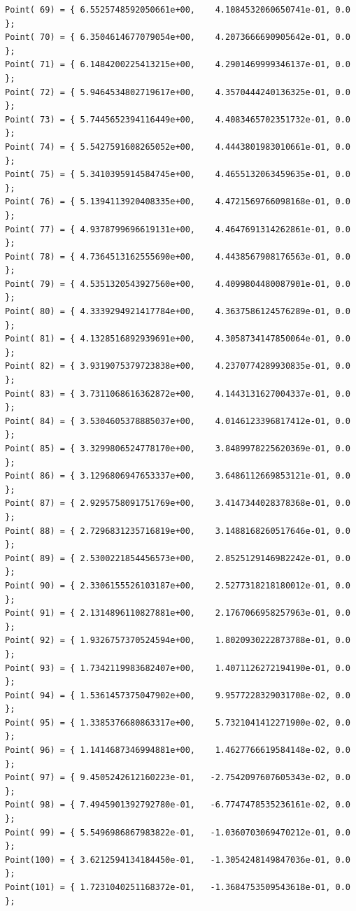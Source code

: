 \documentclass[12pt]{article}
\begin{document}
\begin{CJK}{UTF8}{gkai}
\begin{verbatim}
Point( 69) = { 6.5525748592050661e+00,    4.1084532060650741e-01, 0.0 };
Point( 70) = { 6.3504614677079054e+00,    4.2073666690905642e-01, 0.0 };
Point( 71) = { 6.1484200225413215e+00,    4.2901469999346137e-01, 0.0 };
Point( 72) = { 5.9464534802719617e+00,    4.3570444240136325e-01, 0.0 };
Point( 73) = { 5.7445652394116449e+00,    4.4083465702351732e-01, 0.0 };
Point( 74) = { 5.5427591608265052e+00,    4.4443801983010661e-01, 0.0 };
Point( 75) = { 5.3410395914584745e+00,    4.4655132063459635e-01, 0.0 };
Point( 76) = { 5.1394113920408335e+00,    4.4721569766098168e-01, 0.0 };
Point( 77) = { 4.9378799696619131e+00,    4.4647691314262861e-01, 0.0 };
Point( 78) = { 4.7364513162555690e+00,    4.4438567908176563e-01, 0.0 };
Point( 79) = { 4.5351320543927560e+00,    4.4099804480087901e-01, 0.0 };
Point( 80) = { 4.3339294921417784e+00,    4.3637586124576289e-01, 0.0 };
Point( 81) = { 4.1328516892939691e+00,    4.3058734147850064e-01, 0.0 };
Point( 82) = { 3.9319075379723838e+00,    4.2370774289930835e-01, 0.0 };
Point( 83) = { 3.7311068616362872e+00,    4.1443131627004337e-01, 0.0 };
Point( 84) = { 3.5304605378885037e+00,    4.0146123396817412e-01, 0.0 };
Point( 85) = { 3.3299806524778170e+00,    3.8489978225620369e-01, 0.0 };
Point( 86) = { 3.1296806947653337e+00,    3.6486112669853121e-01, 0.0 };
Point( 87) = { 2.9295758091751769e+00,    3.4147344028378368e-01, 0.0 };
Point( 88) = { 2.7296831235716819e+00,    3.1488168260517646e-01, 0.0 };
Point( 89) = { 2.5300221854456573e+00,    2.8525129146982242e-01, 0.0 };
Point( 90) = { 2.3306155526103187e+00,    2.5277318218180012e-01, 0.0 };
Point( 91) = { 2.1314896110827881e+00,    2.1767066958257963e-01, 0.0 };
Point( 92) = { 1.9326757370524594e+00,    1.8020930222873788e-01, 0.0 };
Point( 93) = { 1.7342119983682407e+00,    1.4071126272194190e-01, 0.0 };
Point( 94) = { 1.5361457375047902e+00,    9.9577228329031708e-02, 0.0 };
Point( 95) = { 1.3385376680863317e+00,    5.7321041412271900e-02, 0.0 };
Point( 96) = { 1.1414687346994881e+00,    1.4627766619584148e-02, 0.0 };
Point( 97) = { 9.4505242612160223e-01,   -2.7542097607605343e-02, 0.0 };
Point( 98) = { 7.4945901392792780e-01,   -6.7747478535236161e-02, 0.0 };
Point( 99) = { 5.5496986867983822e-01,   -1.0360703069470212e-01, 0.0 };
Point(100) = { 3.6212594134184450e-01,   -1.3054248149847036e-01, 0.0 };
Point(101) = { 1.7231040251168372e-01,   -1.3684753509543618e-01, 0.0 };


\end{verbatim}
\end{CJK}
\end{document}
